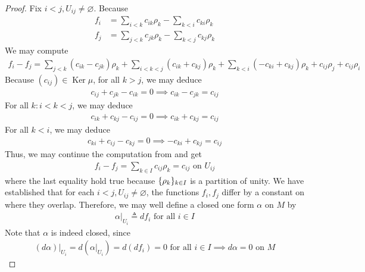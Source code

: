 \documentclass{report}
\begin{document}
\begin{proof}
Fix $i<j,U_{ij}\neq \varnothing$. Because 
\begin{align*}
f_i&= \sum_{i <k}c_{ik}\rho_k - \sum_{k<i}c_{ki}\rho_k \\
f_j&=\sum_{j<k}c_{jk}\rho_k - \sum_{k<j} c_{kj}\rho_k 
\end{align*}
We may compute 
\begin{align}
\label{fij}
f_i - f_j = \sum_{j<k} (c_{ik}-c_{jk})\rho_k + \sum_{i<k<j}(c_{ik}+c_{kj})\rho_k + \sum_{k<i}(-c_{ki}+c_{kj})\rho_k +c_{ij}\rho_j + c_{ij}\rho_i 
\end{align}
Because  $(c_{ij})\in \operatorname{Ker}\mu$, for all $k>j$, we may deduce
 \begin{align*}
c_{ij}+c_{jk}-c_{ik}=0 \implies c_{ik}- c_{jk}= c_{ij}
\end{align*}
For all $k:i<k<j$, we may deduce 
 \begin{align*}
c_{ik}+c_{kj}-c_{ij}=0 \implies c_{ik}+c_{kj}=c_{ij}
\end{align*}
For all $k<i$, we may deduce 
\begin{align*}
c_{ki}+ c_{ij}-c_{kj}=0 \implies -c_{ki}+c_{kj}=c_{ij}
\end{align*}
Thus, we may continue the computation from  and get 
\begin{align*}
f_i-f_j= \sum_{k \in I}c_{ij}\rho_k= c_{ij}\text{ on }U_{ij}
\end{align*}
where the last equality hold true because $\{ \rho_k \}_{k\in I}$ is a partition of unity. We have established that for each $i<j,U_{ij}\neq \varnothing$, the functions  $f_i,f_j$ differ by a constant on where they overlap. Therefore, we may well define a closed one form  $\alpha $ on $M$ by 
 \begin{align*}
\alpha |_{U_i}\triangleq df_i\text{ for all }i \in I
\end{align*}
Note that $\alpha $ is indeed closed, since 
\begin{align*}
  (d\alpha) |_{U_i}= d(\alpha |_{U_i} )=d(df_i)=0 \text{ for all }i \in I \implies  d\alpha =0\text{ on }M
\end{align*}
\end{proof}
\end{document}
